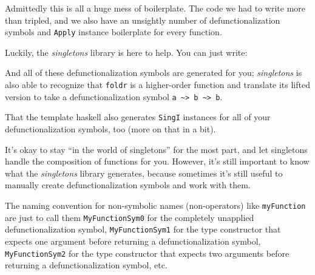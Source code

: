 \documentclass[]{article}
\newenvironment{Shaded}{}{}
\newcommand{\FunctionTok}[1]{\textcolor[rgb]{0.02,0.16,0.49}{#1}}
\newcommand{\NormalTok}[1]{#1}
\begin{document}
Admittedly this is all a huge mess of boilerplate. The code we had to write more
than tripled, and we also have an unsightly number of defunctionalization
symbols and \texttt{Apply} instance boilerplate for every function.

Luckily, the \emph{singletons} library is here to help. You can just write:

\begin{Shaded}
\end{Shaded}

And all of these defunctionalization symbols are generated for you;
\emph{singletons} is also able to recognize that \texttt{foldr} is a
higher-order function and translate its lifted version to take a
defunctionalization symbol
\texttt{a\ \textasciitilde{}\textgreater{}\ b\ \textasciitilde{}\textgreater{}\ b}.

That the template haskell also generates \texttt{SingI} instances for all of
your defunctionalization symbols, too (more on that in a bit).

It's okay to stay ``in the world of singletons'' for the most part, and let
singletons handle the composition of functions for you. However, it's still
important to know what the \emph{singletons} library generates, because
sometimes it's still useful to manually create defunctionalization symbols and
work with them.

The naming convention for non-symbolic names (non-operators) like
\texttt{myFunction} are just to call them \texttt{MyFunctionSym0} for the
completely unapplied defunctionalization symbol, \texttt{MyFunctionSym1} for the
type constructor that expects one argument before returning a
defunctionalization symbol, \texttt{MyFunctionSym2} for the type constructor
that expects two arguments before returning a defunctionalization symbol, etc.
\end{document}

